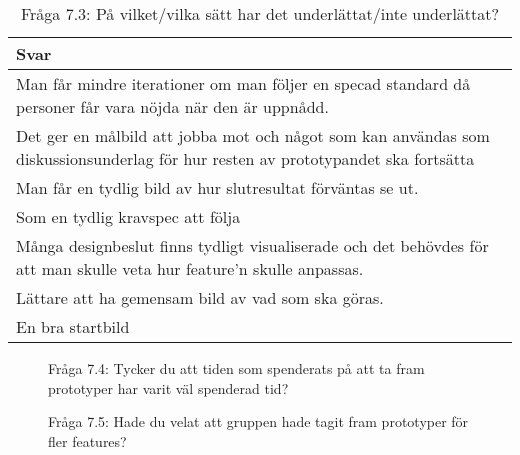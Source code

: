 \begin{table}[h!]
  \caption{Fråga 7.3: På vilket/vilka sätt har det underlättat/inte underlättat?}
  \def\arraystretch{1.5}
  \begin{adjustbox}{max width=\textwidth}
    \begin{tabularx}{\textwidth}{ | X |}
      \hline
      \textbf{Svar} \\
      \hline
      Man får mindre iterationer om man följer en specad standard då personer får vara nöjda när den är uppnådd. \\
      \hline
      Det ger en målbild att jobba mot och något som kan användas som diskussionsunderlag för hur resten av prototypandet ska fortsätta \\
      \hline
      Man får en tydlig bild av hur slutresultat förväntas se ut. \\
      \hline 
      Som en tydlig kravspec att följa \\
      \hline 
      Många designbeslut finns tydligt visualiserade och det behövdes för att man skulle veta hur feature'n skulle anpassas. \\
      \hline 
      Lättare att ha gemensam bild av vad som ska göras. \\
      \hline 
      En bra startbild \\
      \hline  
    \end{tabularx}
  \end{adjustbox}
  \label{tab:prototyp_enkat_ease}
\end{table}

\begin{figure}[H]
  \centering
  \caption{Fråga 7.4: Tycker du att tiden som spenderats på att ta fram prototyper har varit väl spenderad tid?}
\end{figure}

\begin{figure}[H]
  \centering
  \caption{Fråga 7.5: Hade du velat att gruppen hade tagit fram prototyper för fler features?}
\end{figure}

